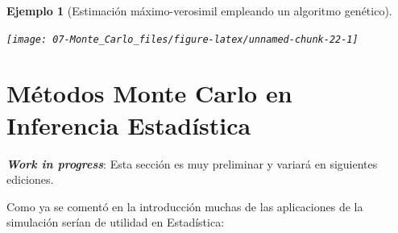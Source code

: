 \documentclass[
  10pt,
]{book}
\newenvironment{Shaded}{\begin{snugshade}}{\end{snugshade}}
\newcommand{\AttributeTok}[1]{\textcolor[rgb]{0.77,0.63,0.00}{#1}}
\newcommand{\CommentTok}[1]{\textcolor[rgb]{0.56,0.35,0.01}{\textit{#1}}}
\newcommand{\DecValTok}[1]{\textcolor[rgb]{0.00,0.00,0.81}{#1}}
\newcommand{\FunctionTok}[1]{\textcolor[rgb]{0.00,0.00,0.00}{#1}}
\newcommand{\NormalTok}[1]{#1}
\newcommand{\SpecialCharTok}[1]{\textcolor[rgb]{0.00,0.00,0.00}{#1}}
\theoremstyle{break}
\newtheorem{example}{Ejemplo}[chapter]
\theoremstyle{nonumberplain}
\renewcommand{\CommentTok}[1]{\textcolor[rgb]{0.41,0.41,0.41}{\texttt{#1}}}
\begin{document}
\begin{example}[Estimación máximo-verosimil empleando un algoritmo genético]
\begin{Shaded}
\end{Shaded}

\begin{center}\texttt{[image: 07-Monte\_Carlo\_files/figure-latex/unnamed-chunk-22-1]} \end{center}

\end{example}

\hypertarget{aplic-inf}{%
\section{Métodos Monte Carlo en Inferencia Estadística}\label{aplic-inf}}

\textbf{\emph{Work in progress}}: Esta sección es muy preliminar y variará en siguientes ediciones.

Como ya se comentó en la introducción muchas de las aplicaciones de la simulación serían de utilidad en Estadística:
\end{document}
